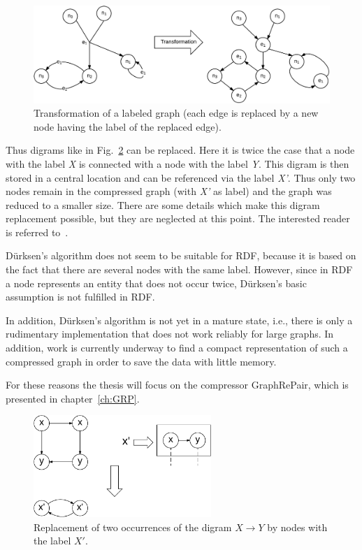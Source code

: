 \begin{figure}[h]
	\centering
	\includegraphics[width=1\textwidth]{figures/relatedwork/transf}
	\caption{Transformation of a labeled graph (each edge is replaced by a new node having the label of the replaced edge).}
	\label{fig:transformation}
\end{figure}

Thus digrams like in Fig.~\ref{fig:basicdigram} can be replaced. Here it is twice the case that a node with the label \textit{X} is connected with a node with the label \textit{Y}. This digram is then stored in a central location and can be referenced via the label \textit{X'}. Thus only two nodes remain in the compressed graph (with \textit{X'} as label) and the graph was reduced to a smaller size. There are some details which make  this digram replacement possible, but they are neglected at this point. The interested reader is referred to~\cite{mattdk}.

Dürksen's algorithm does not seem to be suitable for RDF, because it is based on the fact that there are several nodes with the same label. However, since in RDF a node represents an entity that does not occur twice, Dürksen's basic assumption is not fulfilled in RDF.

In addition, Dürksen's algorithm is not yet in a mature state, i.e., there is only a rudimentary implementation that does not work reliably for large graphs. In addition, work is currently underway to find a compact representation of such a compressed graph in order to save the data with little memory.~\cite{mattdk}

For these reasons the thesis will focus on the compressor GraphRePair, which is presented in chapter~\ref{ch:GRP}.

\begin{figure}[h]
	\centering
	\includegraphics[width=0.6\textwidth]{figures/relatedwork/basisdigram}
	\caption{Replacement of two occurrences of the digram $X \to Y$ by nodes with the label $X'$.}
	\label{fig:basicdigram}
\end{figure}

